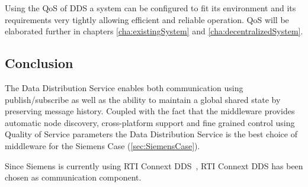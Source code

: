 Using the QoS of DDS a system can be configured to fit its environment and its requirements very tightly allowing efficient and reliable operation. QoS will be elaborated further in chapters \cref{cha:existingSystem} and \cref{cha:decentralizedSystem}.

\subsection{Conclusion}
The Data Distribution Service enables both communication using publish/subscribe as well as the ability to maintain a global shared state by preserving message history. Coupled with the fact that the middleware provides automatic node discovery, cross-platform support and fine grained control using Quality of Service parameters the Data Distribution Service is the best choice of middleware for the Siemens Case (\cref{sec:SiemensCase}).

Since Siemens is currently using RTI Connext DDS~\cite{siemensdds}, RTI Connext DDS has been chosen as communication component. 
